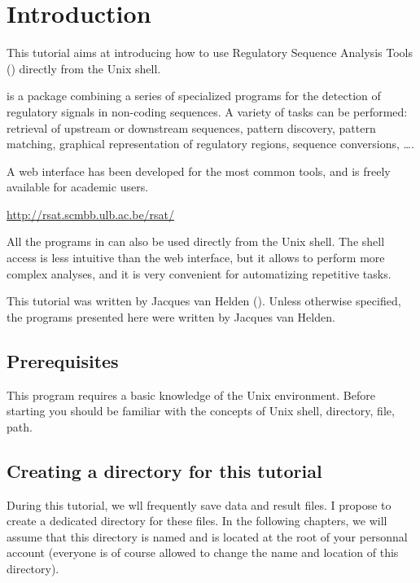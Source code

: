 
\chapter{Introduction}

This tutorial aims at introducing how to use Regulatory Sequence
Analysis Tools (\RSAT) directly from the Unix shell.

\RSAT is a package combining a series of specialized programs for the
detection of regulatory signals in non-coding sequences. A variety of
tasks can be performed: retrieval of upstream or downstream sequences,
pattern discovery, pattern matching, graphical representation of
regulatory regions, sequence conversions, \ldots.

A web interface has been developed for the most common tools, and is
freely available for academic users.

\url{http://rsat.scmbb.ulb.ac.be/rsat/}

All the programs in \RSAT can also be used directly from the Unix
shell. The shell access is less intuitive than the web interface, but
it allows to perform more complex analyses, and it is very convenient
for automatizing repetitive tasks.

This tutorial was written by Jacques van Helden
().  Unless otherwise specified,
the programs presented here were written by Jacques van Helden.

\section{Prerequisites}

This program requires a basic knowledge of the Unix
environment. Before starting you should be familiar with the concepts
of Unix shell, directory, file, path.

\section{Creating a directory for this tutorial}

During this tutorial, we wll frequently save data and result files. I
propose to create a dedicated directory for these files. In the
following chapters, we will assume that this directory is named
 and is located at the root of your personnal
account (everyone is of course allowed to change the name and location
of this directory).

